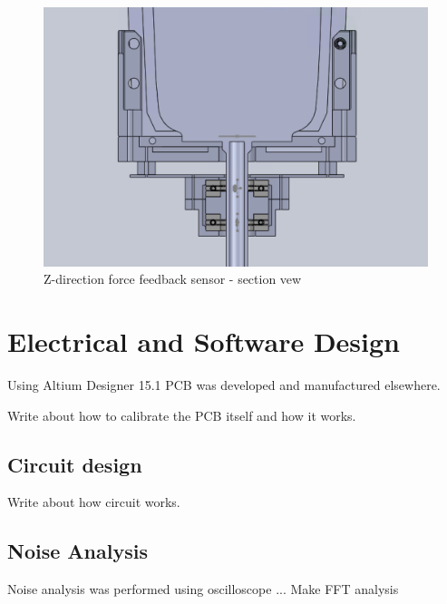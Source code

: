		\begin{figure}
			\begin{center}
			\includegraphics[width=120mm]{fig/methods/z_dir_sec.png}
			\end{center}
			\vspace{-4mm}
		\caption[Z-direction force feedback sensor - section vew]
		{Z-direction force feedback sensor - section vew}
		\label{fig:Z-direction_sec}
		\vspace{-2mm}
		\end{figure}

\section{Electrical and Software Design}
\label{sec:elecDes}

Using Altium Designer 15.1 PCB was developed and manufactured elsewhere. 

Write about how to calibrate the PCB itself and how it works.

	\subsection{Circuit design}
	\label{sec:cirDes}
	Write about how circuit works.

	\subsection{Noise Analysis}
	\label{sec:NoiseExp}
	Noise analysis was performed using oscilloscope ... Make FFT analysis

